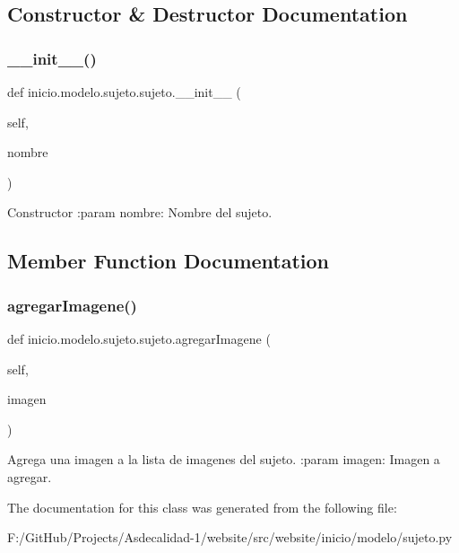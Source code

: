 \subsection{Constructor \& Destructor Documentation}
\mbox{\label{classinicio_1_1modelo_1_1sujeto_1_1sujeto_adc5fdb70533f566da487a316f753a0e8}} 
\subsubsection{\texorpdfstring{\+\_\+\+\_\+init\+\_\+\+\_\+()}{\_\_init\_\_()}}
{\footnotesize\ttfamily def inicio.\+modelo.\+sujeto.\+sujeto.\+\_\+\+\_\+init\+\_\+\+\_\+ (\begin{DoxyParamCaption}\item[{}]{self,  }\item[{}]{nombre }\end{DoxyParamCaption})}

\begin{DoxyVerb}Constructor
:param nombre: Nombre del sujeto.
\end{DoxyVerb}
 

\subsection{Member Function Documentation}
\mbox{\label{classinicio_1_1modelo_1_1sujeto_1_1sujeto_a6f4b6d7118b152c714e87d5c7e38d60a}} 
\subsubsection{\texorpdfstring{agregar\+Imagene()}{agregarImagene()}}
{\footnotesize\ttfamily def inicio.\+modelo.\+sujeto.\+sujeto.\+agregar\+Imagene (\begin{DoxyParamCaption}\item[{}]{self,  }\item[{}]{imagen }\end{DoxyParamCaption})}

\begin{DoxyVerb}Agrega una imagen a la lista de imagenes del sujeto.
:param imagen: Imagen a agregar.
\end{DoxyVerb}
 

The documentation for this class was generated from the following file\+:\begin{DoxyCompactItemize}
\item 
F\+:/\+Git\+Hub/\+Projects/\+Asdecalidad-\/1/website/src/website/inicio/modelo/sujeto.\+py\end{DoxyCompactItemize}
